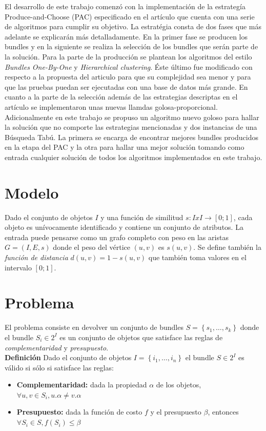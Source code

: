 El desarrollo de este trabajo comenzó con la implementación de la estrategía Produce-and-Choose (PAC) especificado en el artículo \cite{compositeRetrival} que cuenta con una serie de algoritmos para cumplir su objetivo. La estratégia consta de dos fases que más adelante se explicarán más detalladamente. En la primer fase se producen los bundles y en la siguiente se realiza la selección de los bundles que serán parte de la solución. Para la parte de la producción se plantean los algoritmos del estilo \textit{Bundles One-By-One} y \textit{Hierarchical clustering}. Éste último fue modificado con respecto a la propuesta del articulo para que su complejidad sea menor y para que las pruebas puedan ser ejecutadas con una base de datos más grande. En cuanto a la parte de la selección además de las estrategias descriptas en el artículo se implementaron unas nuevas llamdas golosa-proporcional.\\
Adicionalmente en este trabajo se propuso un algoritmo nuevo goloso para hallar la solución que no comporte las estrategias mencionadas y dos instancias de una Búsqueda Tabú. La primera se encarga de encontrar mejores bundles producidos en la etapa del PAC y la otra para hallar una mejor solución tomando como entrada cualquier solución de todos los algoritmos implementados en este trabajo.

\section{Modelo}
Dado el conjunto de objetos $I$ y una función de similitud $ s: I x I \rightarrow [0;1]$, cada objeto es unívocamente identificado y contiene un conjunto de atributos. La entrada puede pensarse como un grafo completo con peso en las aristas $G=(I,E,s)$ donde el peso del vértice $(u,v)$ es $s(u,v)$. Se define también la \textit{función de distancia} $d(u,v) = 1 - s(u,v)$ que también toma valores en el intervalo $[0;1]$.

\section{Problema}
El problema consiste en devolver un conjunto de bundles $S = \left\{s_1, \ldots, s_k\right\}$ donde el bundle $S_i \in 2^{I}$ es un conjunto de objetos que satisface las reglas de \textit{complementaridad} y \textit{presupuesto}.\\
\textbf{Definición} Dado el conjunto de objetos $I=\left\{i_1,\ldots, i_n\right\}$ el bundle $S \in 2^{I}$ es válido si sólo si satisface las reglas:
\begin{itemize}
	\item \textbf{Complementaridad:} dada la propiedad $\alpha$ de los objetos, $\forall u,v \in S_i, u.\alpha \neq v.\alpha$
	\item \textbf{Presupuesto:} dada la función de costo $f$ y el presupuesto $\beta$, entonces $\forall S_i \in S, f(S_i) \leq \beta$
\end{itemize}

